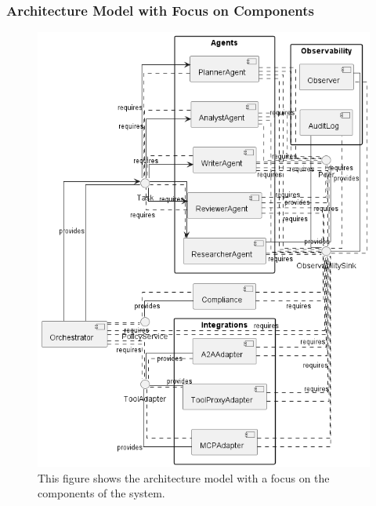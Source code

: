 \subsubsection*{Architecture Model with Focus on Components }
\begin{figure}[htbp]
  \centering
  \includegraphics[width=0.8\linewidth]{ressources/MAS/diagrams/MAS_architecture_complete_appendix.png}
  \caption{This figure shows the architecture model with a focus on the components of the system.}
  \label{fig:app-mas-arch-mod}
\end{figure}

\clearpage
